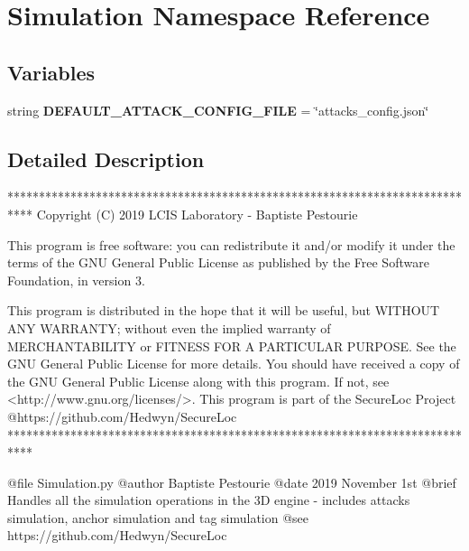 \hypertarget{namespace_simulation}{}\section{Simulation Namespace Reference}
\label{namespace_simulation}
\subsection*{Variables}
\begin{DoxyCompactItemize}
\item 
\mbox{\label{namespace_simulation_a73f4d23d61bde290714ae18813fc005a}} 
string {\bfseries D\+E\+F\+A\+U\+L\+T\+\_\+\+A\+T\+T\+A\+C\+K\+\_\+\+C\+O\+N\+F\+I\+G\+\_\+\+F\+I\+LE} = \char`\"{}attacks\+\_\+config.\+json\char`\"{}
\end{DoxyCompactItemize}


\subsection{Detailed Description}
\begin{DoxyVerb}****************************************************************************
Copyright (C) 2019 LCIS Laboratory - Baptiste Pestourie

This program is free software: you can redistribute it and/or modify
it under the terms of the GNU General Public License as published by
the Free Software Foundation, in version 3.

This program is distributed in the hope that it will be useful,
but WITHOUT ANY WARRANTY; without even the implied warranty of
MERCHANTABILITY or FITNESS FOR A PARTICULAR PURPOSE. See the
GNU General Public License for more details.
You should have received a copy of the GNU General Public License
along with this program. If not, see <http://www.gnu.org/licenses/>.
This program is part of the SecureLoc Project @https://github.com/Hedwyn/SecureLoc
 ****************************************************************************

@file Simulation.py
@author Baptiste Pestourie
@date 2019 November 1st
@brief Handles all the simulation operations in the 3D engine - includes attacks simulation, anchor simulation and tag simulation
@see https://github.com/Hedwyn/SecureLoc
\end{DoxyVerb}
 